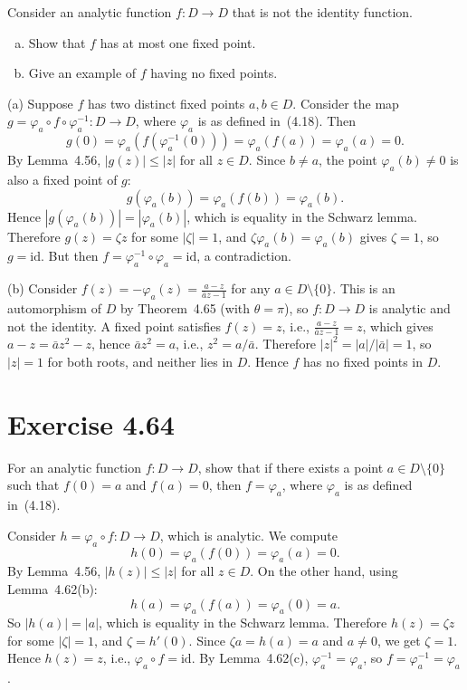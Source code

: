 \documentclass{article}
\begin{document}
Consider an analytic function $f : D \to D$ that is not the identity
function.
\begin{enumerate}[(a)]
  \item Show that $f$ has at most one fixed point.
  \item Give an example of $f$ having no fixed points.
\end{enumerate}

\begin{solution}
  (a) Suppose $f$ has two distinct fixed points $a, b \in D$.
  Consider the map $g = \varphi_a \circ f \circ \varphi_a^{-1} : D \to
  D$, where $\varphi_a$ is as defined in~(4.18). Then
  \[
    g(0) = \varphi_a(f(\varphi_a^{-1}(0))) = \varphi_a(f(a))
    = \varphi_a(a) = 0.
  \]
  By Lemma~4.56, $|g(z)| \le |z|$ for all $z \in D$. Since $b \ne a$,
  the point $\varphi_a(b) \ne 0$ is also a fixed point of $g$:
  \[
    g(\varphi_a(b)) = \varphi_a(f(b)) = \varphi_a(b).
  \]
  Hence $|g(\varphi_a(b))| = |\varphi_a(b)|$, which is equality in the
  Schwarz lemma. Therefore $g(z) = \zeta z$ for some $|\zeta| = 1$, and
  $\zeta \varphi_a(b) = \varphi_a(b)$ gives $\zeta = 1$, so
  $g = \mathrm{id}$. But then $f = \varphi_a^{-1} \circ \varphi_a =
  \mathrm{id}$, a contradiction.

  \medskip
  (b) Consider $f(z) = -\varphi_a(z) = \frac{a - z}{\bar{a}z - 1}$
  for any $a \in D \setminus \{0\}$.
  This is an automorphism of $D$ by Theorem~4.65 (with $\theta = \pi$),
  so $f : D \to D$ is analytic and not the identity.
  A fixed point satisfies $f(z) = z$, i.e.,
  $\frac{a - z}{\bar{a}z - 1} = z$, which gives
  $a - z = \bar{a}z^2 - z$, hence $\bar{a}z^2 = a$,
  i.e., $z^2 = a/\bar{a}$.
  Therefore $|z|^2 = |a|/|\bar{a}| = 1$, so $|z| = 1$ for both roots,
  and neither lies in $D$.
  Hence $f$ has no fixed points in $D$.
\end{solution}

\section{Exercise 4.64}

For an analytic function $f : D \to D$, show that if there exists a
point $a \in D \setminus \{0\}$ such that $f(0) = a$ and $f(a) = 0$,
then $f = \varphi_a$, where $\varphi_a$ is as defined in~(4.18).

\begin{solution}
  Consider $h = \varphi_a \circ f : D \to D$, which is analytic.
  We compute
  \[
    h(0) = \varphi_a(f(0)) = \varphi_a(a) = 0.
  \]
  By Lemma~4.56, $|h(z)| \le |z|$ for all $z \in D$. On the other
  hand, using Lemma~4.62(b):
  \[
    h(a) = \varphi_a(f(a)) = \varphi_a(0) = a.
  \]
  So $|h(a)| = |a|$, which is equality in the Schwarz lemma. Therefore
  $h(z) = \zeta z$ for some $|\zeta| = 1$, and $\zeta = h'(0)$.
  Since $\zeta a = h(a) = a$ and $a \ne 0$, we get $\zeta = 1$.
  Hence $h(z) = z$, i.e., $\varphi_a \circ f = \mathrm{id}$.
  By Lemma~4.62(c), $\varphi_a^{-1} = \varphi_a$, so
  $f = \varphi_a^{-1} = \varphi_a$.
\end{solution}
\end{document}
